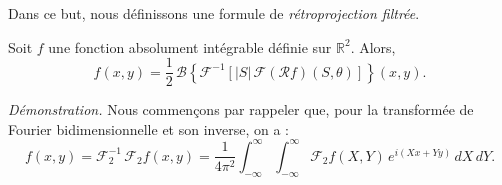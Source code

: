 Dans ce but, nous définissons une formule de \emph{rétroprojection filtrée}.
\begin{proposition}
    Soit $f$ une fonction absolument intégrable définie sur $\mathbb{R}^2$. Alors,
    \begin{equation}
        f(x,y)
        =
        \frac{1}{2}\,
        \mathcal{B}\!\left\{
        \mathcal{F}^{-1}
        \!\left[
        |S|\,
        \mathcal{F}\!\left(\mathcal{R}f\right)(S,\theta)
        \right]
        \right\}(x,y).
        \label{eq:FBP_filter}
    \end{equation}
\end{proposition}
\textit{Démonstration.}
Nous commençons par rappeler que, pour la transformée de Fourier bidimensionnelle
et son inverse, on a :
\begin{equation}
f(x,y) = \mathcal{F}_2^{-1}\,\mathcal{F}_2 f(x,y)
= \frac{1}{4\pi^2}
\int_{-\infty}^{\infty}\int_{-\infty}^{\infty}
\mathcal{F}_2 f(X,Y)\,e^{i(Xx+Yy)}\,dX\,dY.
\label{eq:fourier_2d_inverse}
\end{equation}

